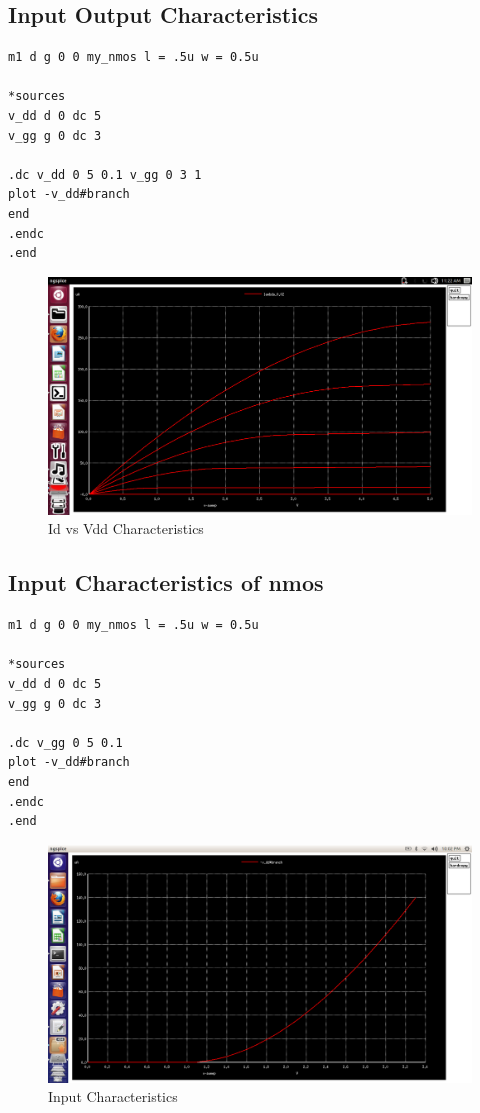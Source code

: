 \documentclass[12pt,a4paper]{article}
\begin{document}
\begin{center}
\subsection{Input Output Characteristics}
\begin{lstlisting}
m1 d g 0 0 my_nmos l = .5u w = 0.5u

*sources
v_dd d 0 dc 5
v_gg g 0 dc 3

.dc v_dd 0 5 0.1 v_gg 0 3 1
plot -v_dd#branch
end
.endc
.end

\end{lstlisting}

\begin{figure}[!ht]
\centering
\includegraphics[scale=0.34]{lambda1a.png}
\caption[Short]{Id vs Vdd Characteristics}
\end{figure}
\vspace{15pt}
\subsection{Input Characteristics of nmos}
\begin{lstlisting}
m1 d g 0 0 my_nmos l = .5u w = 0.5u

*sources
v_dd d 0 dc 5
v_gg g 0 dc 3

.dc v_gg 0 5 0.1 
plot -v_dd#branch
end
.endc
.end

\end{lstlisting}
\clearpage
\begin{figure}[!ht]
\centering
\includegraphics[scale=0.34]{lab1.png}
\caption[Short]{Input Characteristics}
\end{figure}


\end{center}
\end{document}
